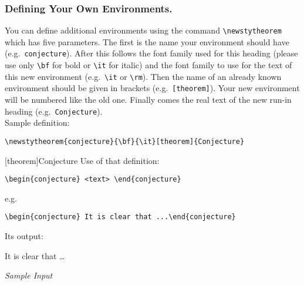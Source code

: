 \subsubsection*{Defining Your Own Environments.}
%
You can define additional environments using the command
\verb|\newstytheorem| which has five parameters. The first is the name
your environment should have (e.g.\ \verb|conjecture|).
After this follows the
font family used for this heading (please use only \verb|\bf| for bold
or \verb|\it| for italic) and the font family to use for the text of
this new environment (e.g.\ \verb|\it| or \verb|\rm|). Then the name of
an already known environment should be given in brackets (e.g.\
\verb|[theorem]|). Your new environment will be numbered like the old
one. Finally comes the real text of the new run-in heading (e.g.\
\verb|Conjecture|).\\
Sample definition:
\begin{verbatim}
[theorem]{Conjecture}
\end{verbatim}
\newstytheorem{conjecture}{\bf}{\it}[theorem]{Conjecture}
Use of that definition:
\begin{verbatim}
\begin{conjecture} <text> \end{conjecture}
\end{verbatim}
e.g.
\begin{verbatim}
\begin{conjecture} It is clear that ...\end{conjecture}
\end{verbatim}
Its output:
\begin{conjecture}
It is clear that \dots
\end{conjecture}
%
\noindent
{\it Sample Input}
\label{samppage}
